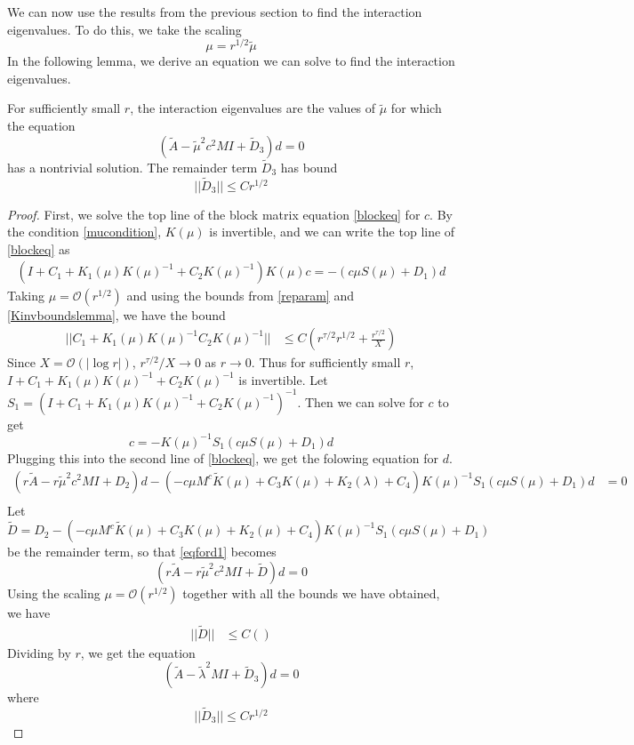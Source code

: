 \documentclass[thesis.tex]{subfiles}
\begin{document}
We can now use the results from the previous section to find the interaction eigenvalues. To do this, we take the scaling
\[
\mu = r^{1/2}\tilde{\mu}
\]
In the following lemma, we derive an equation we can solve to find the interaction eigenvalues.

\begin{lemma}\label{deqlemma}
For sufficiently small $r$, the interaction eigenvalues are the values of $\tilde{\mu}$ for which the equation
\begin{equation}\label{eqford}
(\tilde{A} - \tilde{\mu}^2 c^2 M I + \tilde{D}_3)d = 0
\end{equation}
has a nontrivial solution. The remainder term $\tilde{D}_3$ has bound
\begin{equation}\label{tildeD3bound}
||\tilde{D}_3|| \leq C r^{1/2}
\end{equation}

\begin{proof}
First, we solve the top line of the block matrix equation \eqref{blockeq} for $c$. By the condition \cref{mucondition}, $K(\mu)$ is invertible, and we can write the top line of \eqref{blockeq} as
\begin{align*}
(I + C_1 + K_1(\mu)K(\mu)^{-1} + C_2 K(\mu)^{-1} ) K(\mu) c = -(c \mu S(\mu) + D_1) d
\end{align*}
Taking $\mu = \mathcal{O}(r^{1/2})$ and using the bounds from \cref{reparam} and \cref{Kinvboundslemma}, we have the bound
\begin{align*}
||C_1 + K_1(\mu)K(\mu)^{-1} C_2 K(\mu)^{-1}|| &\leq C\left( r^{\tau/2} r^{1/2} + \frac{r^{\tau/2}}{X} \right)
\end{align*}
Since $X = \mathcal{O}(|\log r|)$, $r^{\tau/2}/X \rightarrow 0$ as $r \rightarrow 0$. Thus for sufficiently small $r$, $I + C_1 + K_1(\mu)K(\mu)^{-1} + C_2 K(\mu)^{-1}$ is invertible. Let $S_1 = (I + C_1 + K_1(\mu)K(\mu)^{-1} + C_2 K(\mu)^{-1})^{-1}$. Then we can solve for $c$ to get
\[
c = -K(\mu)^{-1} S_1(c \mu S(\mu) + D_1) d
\]
Plugging this into the second line of \eqref{blockeq}, we get the folowing equation for $d$.
\begin{align}\label{eqford1}
(r \tilde{A} - r \tilde{\mu}^2 c^2 MI + D_2)d - 
(-c \mu M^c \tilde{K}(\mu) + C_3 K(\mu) + K_2(\lambda) + C_4)K(\mu)^{-1} S_1(c \mu S(\mu) + D_1) d  &= 0 \\
\end{align}
Let 
\[
\tilde{D} = D_2 -
(-c \mu M^c \tilde{K}(\mu) + C_3 K(\mu) + K_2(\mu) + C_4)K(\mu)^{-1} S_1(c \mu S(\mu) + D_1)
\]
be the remainder term, so that \cref{eqford1} becomes
\begin{equation}\label{eqford2}
(r\tilde{A} - r \tilde{\mu}^2 c^2  MI + \tilde{D})d = 0
\end{equation}
Using the scaling $\mu = \mathcal{O}(r^{1/2})$ together with all the bounds we have obtained, we have
\begin{align*}
||\tilde{D}|| &\leq C \left( \right)
\end{align*}
Dividing by $r$, we get the equation 
\[
(\tilde{A} - \tilde{\lambda}^2 MI + \tilde{D}_3)d = 0
\]
where 
\[
||\tilde{D}_3|| \leq C r^{1/2}
\]
\end{proof}
\end{lemma}
\end{document}
